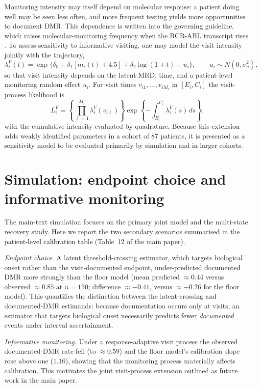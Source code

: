 \documentclass[11pt]{article}
\begin{document}
Monitoring intensity may itself depend on molecular response: a patient doing
well may be seen less often, and more frequent testing yields more
opportunities to document DMR. This dependence is written into the governing
guideline, which raises molecular-monitoring frequency when the BCR-ABL
transcript rises \cite{CSH2011CMLGuideline}. To assess sensitivity to
informative visiting, one may model the visit intensity jointly with the
trajectory,
\[
\lambda_i^V(t)=
\exp\{\delta_0+\delta_1[m_i(t)+4.5]+\delta_2\log(1+t)+u_i\},
\qquad u_i\sim N(0,\sigma_u^2),
\]
so that visit intensity depends on the latent MRD, time, and a patient-level
monitoring random effect $u_i$. For visit times $v_{i1},\ldots,v_{iM_i}$ in
$[E_i,C_i]$ the visit-process likelihood is
\[
L_i^V=
\left\{\prod_{\ell=1}^{M_i}\lambda_i^V(v_{i\ell})\right\}
\exp\left\{-\int_{E_i}^{C_i}\lambda_i^V(s)\,ds\right\},
\]
with the cumulative intensity evaluated by quadrature. Because this extension
adds weakly identified parameters in a cohort of 87 patients, it is presented
as a sensitivity model to be evaluated primarily by simulation and in larger
cohorts.

\section{Simulation: endpoint choice and informative monitoring}
\label{sec:s-sim}

The main-text simulation focuses on the primary joint model and the multi-state
recovery study. Here we report the two secondary scenarios summarised in the
patient-level calibration table (Table~12 of the main paper).

\emph{Endpoint choice.} A latent threshold-crossing estimator, which targets
biological onset rather than the visit-documented endpoint, under-predicted
documented DMR more strongly than the floor model (mean predicted $\approx0.44$
versus observed $\approx0.85$ at $n=150$; difference $\approx-0.41$, versus
$\approx-0.26$ for the floor model). This quantifies the distinction between the
latent-crossing and documented-DMR estimands: because documentation occurs only
at visits, an estimator that targets biological onset necessarily predicts fewer
\emph{documented} events under interval ascertainment.

\emph{Informative monitoring.} Under a response-adaptive visit process the
observed documented-DMR rate fell (to $\approx0.59$) and the floor model's
calibration slope rose above one ($1.16$), showing that the monitoring process
materially affects calibration. This motivates the joint visit-process
extension outlined as future work in the main paper.
\end{document}
